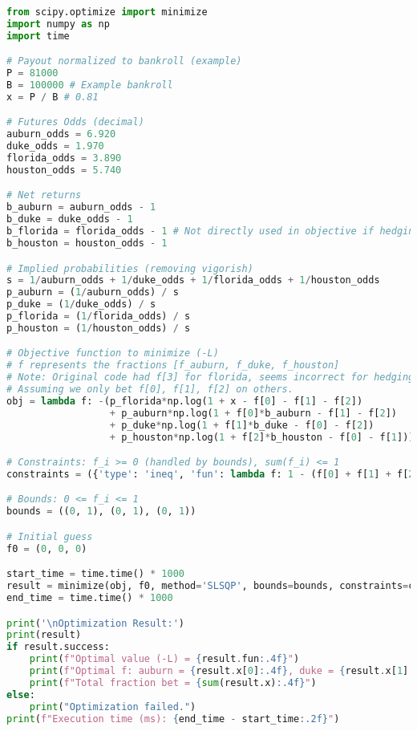 \documentclass{article}
\begin{document}
\begin{lstlisting}[language=Python, caption={Python code using scipy.optimize to find optimal hedge fractions using futures.}]
from scipy.optimize import minimize
import numpy as np
import time

# Payout normalized to bankroll (example)
P = 81000
B = 100000 # Example bankroll
x = P / B # 0.81

# Futures Odds (decimal)
auburn_odds = 6.920
duke_odds = 1.970
florida_odds = 3.890
houston_odds = 5.740

# Net returns
b_auburn = auburn_odds - 1
b_duke = duke_odds - 1
b_florida = florida_odds - 1 # Not directly used in objective if hedging others
b_houston = houston_odds - 1

# Implied probabilities (removing vigorish)
s = 1/auburn_odds + 1/duke_odds + 1/florida_odds + 1/houston_odds
p_auburn = (1/auburn_odds) / s
p_duke = (1/duke_odds) / s
p_florida = (1/florida_odds) / s
p_houston = (1/houston_odds) / s

# Objective function to minimize (-L)
# f represents the fractions [f_auburn, f_duke, f_houston]
# Note: Original code had f[3] for florida, seems incorrect for hedging. 
# Assuming we only bet f[0], f[1], f[2] on others.
obj = lambda f: -(p_florida*np.log(1 + x - f[0] - f[1] - f[2]) 
                  + p_auburn*np.log(1 + f[0]*b_auburn - f[1] - f[2]) 
                  + p_duke*np.log(1 + f[1]*b_duke - f[0] - f[2]) 
                  + p_houston*np.log(1 + f[2]*b_houston - f[0] - f[1]))

# Constraints: f_i >= 0 (handled by bounds), sum(f_i) <= 1
constraints = ({'type': 'ineq', 'fun': lambda f: 1 - (f[0] + f[1] + f[2])})

# Bounds: 0 <= f_i <= 1
bounds = ((0, 1), (0, 1), (0, 1))

# Initial guess
f0 = (0, 0, 0)

start_time = time.time() * 1000
result = minimize(obj, f0, method='SLSQP', bounds=bounds, constraints=constraints)
end_time = time.time() * 1000

print('\nOptimization Result:')
print(result)
if result.success:
    print(f"Optimal value (-L) = {result.fun:.4f}")
    print(f"Optimal f: auburn = {result.x[0]:.4f}, duke = {result.x[1]:.4f}, houston = {result.x[2]:.4f}")
    print(f"Total fraction bet = {sum(result.x):.4f}")
else:
    print("Optimization failed.")
print(f"Execution time (ms): {end_time - start_time:.2f}")

\end{lstlisting}
\end{document}
